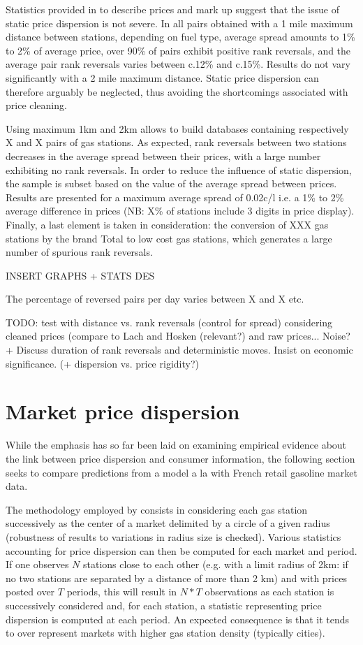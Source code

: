 \documentclass[11pt]{article}
\begin{document}
Statistics provided in \cite{TAP11} to describe prices and mark up suggest that the issue of static price dispersion is not severe. In all pairs obtained with a 1 mile maximum distance between stations, depending on fuel type, average spread amounts to 1\% to 2\% of average price, over 90\% of pairs exhibit positive rank reversals, and the average pair rank reversals varies between c.12\% and c.15\%. Results do not vary significantly with a 2 mile maximum distance. Static price dispersion can therefore arguably be neglected, thus avoiding the shortcomings associated with price cleaning.

Using maximum 1km and 2km allows to build databases containing respectively X and X pairs of gas stations. As expected, rank reversals between two stations decreases in the average spread between their prices, with a large number exhibiting no rank reversals. In order to reduce the influence of static dispersion, the sample is subset based on the value of the average spread between prices. Results are presented for a maximum average spread of 0.02c/l i.e. a 1\% to 2\% average difference in prices (NB: X\% of stations include 3 digits in price display). Finally, a last element is taken in consideration: the conversion of XXX gas stations by the brand Total to low cost gas stations, which generates a large number of spurious rank reversals.

INSERT GRAPHS + STATS DES

The percentage of reversed pairs per day varies between X and X etc.

TODO: test with distance vs. rank reversals (control for spread) considering cleaned prices (compare to Lach and Hosken (relevant?) and raw prices... Noise? + Discuss duration of rank reversals and deterministic moves. Insist on economic significance. (+ dispersion vs. price rigidity?)

\section{Market price dispersion}

While the emphasis has so far been laid on examining empirical evidence about the link between price dispersion and consumer information, the following section seeks to compare predictions from a model a la \cite{VAR80} with French retail gasoline market data.

The methodology employed by \cite{TAP11} consists in considering each gas station successively as the center of a market delimited by a circle of a given radius (robustness of results to variations in radius size is checked). Various statistics accounting for price dispersion can then be computed for each market and period. If one observes $N$ stations close to each other (e.g. with a limit radius of 2km: if no two stations are separated by a distance of more than 2 km) and with prices posted over $T$ periods, this will result in $N*T$ observations as each station is successively considered and, for each station, a statistic representing price dispersion is computed at each period. An expected consequence is that it tends to over represent markets with higher gas station density (typically cities).
\end{document}
